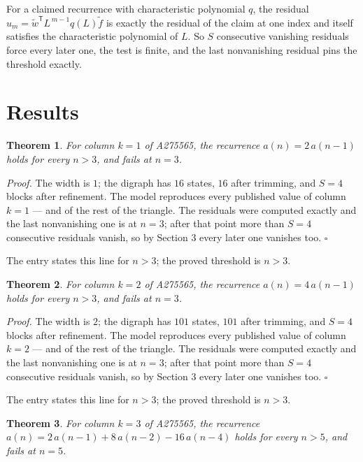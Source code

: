 \documentclass[11pt]{article}
\newtheorem{theorem}{Theorem}
\theoremstyle{definition}
\begin{document}
For a claimed recurrence with characteristic polynomial $q$, the residual $u_m = \tilde w^{\mathsf T}L^{\,m-1}q(L)\tilde f$ is exactly the residual of the claim at one index and itself satisfies the characteristic polynomial of $L$. So $S$ consecutive vanishing residuals force every later one, the test is finite, and the last nonvanishing residual pins the threshold exactly.

\section{Results}

\begin{theorem} For column $k = 1$ of A275565, the recurrence $a(n) = 2\,a(n-1)$ holds for every $n > 3$, and fails at $n = 3$.\end{theorem}

{\itshape Proof.} The width is $1$; the digraph has $16$ states, $16$ after trimming, and $S = 4$ blocks after refinement. The model reproduces every published value of column $k = 1$ --- and of the rest of the triangle. The residuals were computed exactly and the last nonvanishing one is at $n = 3$; after that point more than $S = 4$ consecutive residuals vanish, so by Section 3 every later one vanishes too. $\square$

The entry states this line for $n > 3$; the proved threshold is $n > 3$.

\begin{theorem} For column $k = 2$ of A275565, the recurrence $a(n) = 4\,a(n-1)$ holds for every $n > 3$, and fails at $n = 3$.\end{theorem}

{\itshape Proof.} The width is $2$; the digraph has $101$ states, $101$ after trimming, and $S = 4$ blocks after refinement. The model reproduces every published value of column $k = 2$ --- and of the rest of the triangle. The residuals were computed exactly and the last nonvanishing one is at $n = 3$; after that point more than $S = 4$ consecutive residuals vanish, so by Section 3 every later one vanishes too. $\square$

The entry states this line for $n > 3$; the proved threshold is $n > 3$.

\begin{theorem} For column $k = 3$ of A275565, the recurrence $a(n) = 2\,a(n-1) + 8\,a(n-2) - 16\,a(n-4)$ holds for every $n > 5$, and fails at $n = 5$.\end{theorem}
\end{document}
